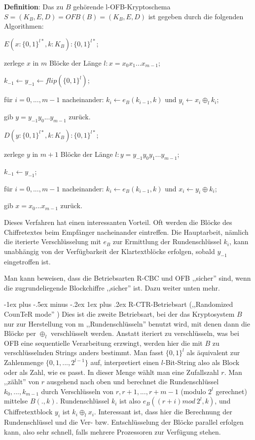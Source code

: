 \documentclass[a4paper]{article}
\makeatletter
\renewcommand{\subsubsection}{\@startsection{subsubsection}{3}{0mm}%
 {-1ex plus -.5ex minus -.2ex}%
 {1ex plus .2ex}%
 {\normalfont\small\bfseries}}
\makeatother
\begin{document}
\begin{multicols}{3}
    \textbf{Definition}: Das zu $B$ gehörende l-OFB-Kryptoschema $S=(K_B,E,D) =OFB(B) =(K_B,E,D)$ ist gegeben durch die folgenden Algorithmen:
    \begin{itemize*}
        \item $E(x:\{0,1\}^{l*},k:K_B) :\{0,1\}^{l*}$;
        \item zerlege $x$ in $m$ Blöcke der Länge $l:x=x_0 x_1 ...x_{m-1}$;
        \item $k_{-1} \leftarrow y_{-1} \leftarrow flip(\{0,1\}^l)$;
        \item für $i=0,...,m-1$ nacheinander: $k_i\leftarrow e_B(k_{i-1},k)$ und $y_i\leftarrow x_i\oplus_l k_i$;
        \item gib $y=y_{-1} y_0 ...y_{m-1}$ zurück.
        \item $D(y:\{0,1\}^{l*},k:K_B) :\{0,1\}^{l*}$;
        \item zerlege $y$ in $m+1$ Blöcke der Länge $l:y=y_{-1} y_0 y_1 ...y_{m-1}$;
        \item $k_{-1} \leftarrow y_{-1}$;
        \item für $i=0,...,m-1$ nacheinander: $k_i\leftarrow e_B(k_{i-1} ,k)$ und $x_i\leftarrow y_i\oplus k_i$;
        \item gib $x=x_0 ...x_{m-1}$ zurück.
    \end{itemize*}

    Dieses Verfahren hat einen interessanten Vorteil. Oft werden die Blöcke des Chiffretextes beim Empfänger nacheinander eintreffen. Die Hauptarbeit, nämlich die iterierte Verschlüsselung mit $e_B$ zur Ermittlung der Rundenschlüssel $k_i$, kann unabhängig von der Verfügbarkeit der Klartextblöcke erfolgen, sobald $y_{-1}$ eingetroffen ist.

    Man kann beweisen, dass die Betriebsarten R-CBC und OFB ,,sicher'' sind, wenn die zugrundeliegende Blockchiffre ,,sicher'' ist. Dazu weiter unten mehr.

    \subsubsection{R-CTR-Betriebsart (,,Randomized CounTeR mode'' )}
    Dies ist die zweite Betriebsart, bei der das Kryptosystem $B$ nur zur Herstellung von m ,,Rundenschlüsseln'' benutzt wird, mit denen dann die Blöcke per $\oplus_l$ verschlüsselt werden. Anstatt iteriert zu verschlüsseln, was bei OFB eine sequentielle Verarbeitung erzwingt, werden hier die mit $B$ zu verschlüsselnden Strings anders bestimmt. Man fasst $\{0,1\}^l$ als äquivalent zur Zahlenmenge $\{0,1,...,2^{l-1}\}$ auf, interpretiert einen $l$-Bit-String also als Block oder als Zahl, wie es passt. In dieser Menge wählt man eine Zufallszahl $r$. Man ,,zählt'' von $r$ ausgehend nach oben und berechnet die Rundenschlüssel $k_0,...,k_{m-1}$ durch Verschlüsseln von $r,r+1,...,r+m-1$ (modulo $2^l$ gerechnet) mittelse $B(.,k)$. Rundenschlüssel $k_i$ ist also $e_B((r+i) mod\ 2^l,k)$, und Chiffretextblock $y_i$ ist $k_i\oplus_l x_i$. Interessant ist, dass hier die Berechnung der Rundenschlüssel und die Ver- bzw. Entschlüsselung der Blöcke parallel erfolgen kann, also sehr schnell, falls mehrere Prozessoren zur Verfügung stehen.


\end{multicols}
\end{document}
